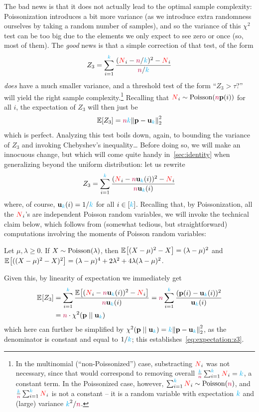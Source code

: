 The bad news is that it does not actually lead to the optimal sample complexity: Poissonization introduces a bit more variance (as we introduce extra randomness ourselves by taking a random number of samples), and so the variance of this $\chi^2$ test can be too big due to the elements we only expect to see zero or once (so, most of them). The \emph{good} news is that a simple correction of that test, of the form
\begin{equation}
  \label{eq:def:z3}
    Z_3 = \sum_{i=1}^{\textcolor{cyan}{k}} \frac{(\textcolor{red}{N}_i-{\textcolor{purple}{n}}/{\textcolor{cyan}{k}})^2- \textcolor{red}{N}_i}{{\textcolor{purple}{n}}/{\textcolor{cyan}{k}}}
\end{equation}
\emph{does} have a much smaller variance, and a threshold test of the form ``$Z_3 > \tau$?'' will yield the right sample complexity.\footnote{In the multinomial (``non-Poissonized'') case, substracting $\textcolor{red}{N}_i$ was not necessary, since that would correspond to removing overall $\frac{{\textcolor{cyan}{k}}}{{\textcolor{purple}{n}}}\sum_{i=1}^{\textcolor{cyan}{k}} \textcolor{red}{N}_i = {\textcolor{cyan}{k}}$, a constant term. In the Poissonized case, however, $\sum_{i=1}^\ab \occur_i\sim\poisson{\ns}$, and $\frac{{\textcolor{cyan}{k}}}{{\textcolor{purple}{n}}}\sum_{i=1}^{\textcolor{cyan}{k}} \textcolor{red}{N}_i$ is not a constant -- it is a random variable with expectation ${\textcolor{cyan}{k}}$ and (large) variance ${\textcolor{cyan}{k}}^2/{\textcolor{purple}{n}}$.} Recalling that $\occur_i\sim\poisson{\ns\p(i)}$ for all $i$, the expectation of $Z_3$ will then just be 
\begin{equation}
  \label{eq:expectation:z3}
    \expect{Z_3} = \ns\ab \normtwo{\p-\uniform_\ab}^2
\end{equation}
which is perfect. Analyzing this test boils down, again, to bounding the variance of $Z_3$ and invoking Chebyshev's inequality\dots{} Before doing so, we will make an innocuous change, but which will come quite handy in~\cref{sec:identity} when generalizing beyond the uniform distribution: let us rewrite
\[
    Z_3 = \sum_{i=1}^{\textcolor{cyan}{k}} \frac{(\textcolor{red}{N}_i-{\textcolor{purple}{n}}\mathbf{u}_{\textcolor{cyan}{k}}(i))^2- \textcolor{red}{N}_i}{{\textcolor{purple}{n}}\mathbf{u}_{\textcolor{cyan}{k}}(i)}
\]
where, of course, $\mathbf{u}_{\textcolor{cyan}{k}}(i) = 1/{\textcolor{cyan}{k}}$ for all $i\in[{\textcolor{cyan}{k}}]$. Recalling that, by Poissonization, all the $\textcolor{red}{N}_i$'s are independent Poisson random variables, we will invoke the technical claim below, which follows from (somewhat tedious, but straightforward) computations involving the moments of Poisson random variables:
\begin{claim}
  \label{claim:uniformity:moments:poisson}
  Let $\mu, \lambda \geq 0$. If $X\sim\poisson{\lambda}$, then 
  $
  \bEE{(X-\mu)^2-X} = (\lambda-\mu)^2
  $
  and 
  $
  \bEE{((X-\mu)^2-X)^2} = (\lambda-\mu)^4 + 2\lambda^2 + 4\lambda(\lambda-\mu)^2
  $.
\end{claim}
Given this, by linearity of expectation we immediately get
\begin{align}
    \bEE{Z_3} 
    &= \sum_{i=1}^\ab \frac{\bEE{(\occur_i-\ns\uniform_\ab(i))^2- \occur_i}}{\ns\uniform_\ab(i)}
    = \ns\sum_{i=1}^\ab \frac{(\p(i)-\uniform_\ab(i))^2}{\uniform_\ab(i)} \notag\\
    &= \ns\cdot\chisquare{\p}{\uniform_\ab} \label{eq:expectation:z3:chisquare}
\end{align}
which here can further be simplified by $\chisquare{\p}{\uniform_\ab} = \ab\normtwo{\p-\uniform_\ab}^2$, as the denominator is constant and equal to $1/{\textcolor{cyan}{k}}$; this establishes~\cref{eq:expectation:z3}.

